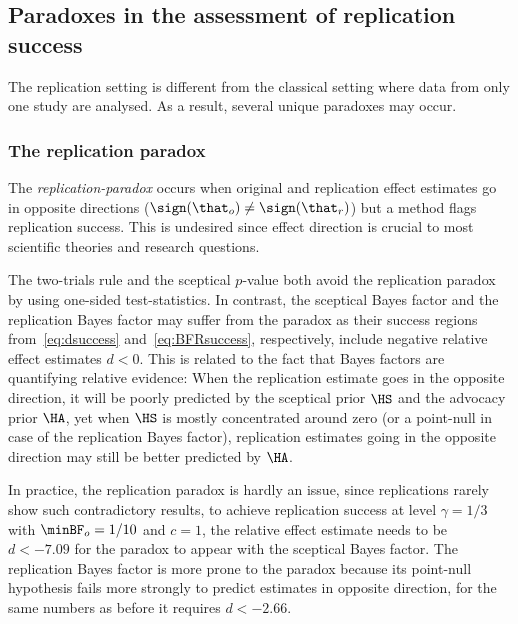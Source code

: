 \subsection{Paradoxes in the assessment of replication success}
The replication setting is different from the classical setting where data from
only one study are analysed. As a result, several unique paradoxes may occur.

\subsubsection{The replication paradox}
\label{sec:replicationParadox}
The \emph{replication-paradox} \citep{Ly2018} occurs when original and
replication effect estimates go in opposite directions
($\sign(\that_{o}) \neq \sign(\that_{r})$) but a method flags replication
success. This is undesired since effect direction is crucial to most
scientific theories and research questions.

The two-trials rule and the sceptical $p$-value both avoid the replication
paradox by using one-sided test-statistics. In contrast, the sceptical Bayes
factor and the replication Bayes factor may suffer from the paradox as their
success regions from~\eqref{eq:dsuccess} and~\eqref{eq:BFRsuccess},
respectively, include negative relative effect estimates $d < 0$. This is
related to the fact that Bayes factors are quantifying relative evidence: When
the replication estimate goes in the opposite direction, it will be poorly
predicted by the sceptical prior $\HS$ and the advocacy prior $\HA$, yet when
$\HS$ is mostly concentrated around zero (or a point-null in case of the
replication Bayes factor), replication estimates going in the opposite direction
may still be better predicted by $\HA$.


In practice, the replication paradox is hardly an issue, since replications
rarely show such contradictory results, \eg to achieve replication success at
level $\gamma = 1/3$ with
$\minBF_{o} = 1/10$ and $c = 1$, the
relative effect estimate needs to be $d < -7.09$ for the
paradox to appear with the sceptical Bayes factor. The replication Bayes factor
is more prone to the paradox because its point-null hypothesis fails more
strongly to predict estimates in opposite direction, \eg for the same numbers as
before it requires $d < -2.66$.

